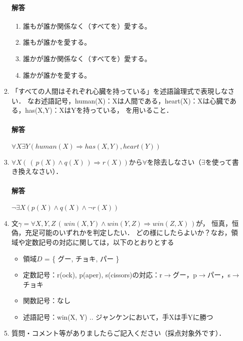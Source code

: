 \documentclass[dvipdfmx]{jsarticle}
\begin{document}
\begin{enumerate}
  \paragraph{解答}
  \begin{enumerate}
    \item 誰もが誰か関係なく（すべてを）愛する。
    \item 誰もが誰かを愛する。
    \item 誰かが誰か関係なく（すべてを）愛する。
    \item 誰かが誰かを愛する。
  \end{enumerate}


\item 「すべての人間はそれぞれ心臓を持っている」を述語論理式で表現しなさい．
  なお述語記号，human(X)：Xは人間である，heart(X)：Xは心臓である，has(X,Y)：XはYを持っている，
  を用いること．
  \paragraph{解答}$\forall X \exists Y(human(X)\Rightarrow has(X, Y), heart(Y))$


\item $\forall X (\, (\, p(X)\land q(X)\,) \Rightarrow r(X) )$から$\forall$を除去しなさい（$\exists$を使って書き換えなさい）．\par
\paragraph{解答}$\neg \exists X(p(X) \wedge q(X) \wedge \neg r(X))$



\item 文$\gamma = \forall X, Y, Z\, (\, win(X,Y) \land win(Y,Z)\Rightarrow  win(Z,X) \,)$が，
  恒真，恒偽，充足可能のいずれかを判定したい．
  どの様にしたらよいか？なお，領域や定数記号の対応に関しては，以下のとおりとする

  \begin{itemize}
  \item 領域$D$ = \{ グー, チョキ, パー \}
  \item 定数記号：r(ock), p(aper), s(cissors)の対応：r$\rightarrow$グー，p$\rightarrow$パー，s$\rightarrow$チョキ
  \item 関数記号：なし
  \item 述語記号：win(X, Y) .. ジャンケンにおいて，手Xは手Yに勝つ
  \end{itemize}

\item 質問・コメント等がありましたらご記入ください（採点対象外です）．

\end{enumerate}
\end{document}

